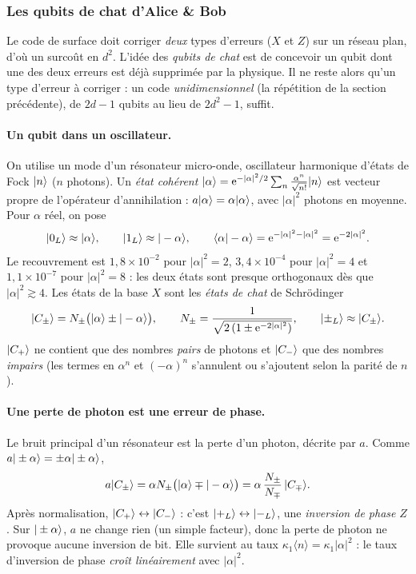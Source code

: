 \subsubsection{Les qubits de chat d'Alice \& Bob}

Le code de surface doit corriger \emph{deux} types d'erreurs ($X$ et $Z$) sur un réseau plan, d'où un surcoût en $d^2$. L'idée des
\emph{qubits de chat} \parencite{mirrahimi2014} est de concevoir un qubit dont une des deux erreurs est déjà supprimée par la physique. Il ne reste
alors qu'un type d'erreur à corriger : un code \emph{unidimensionnel} (la répétition de la section précédente), de $2d-1$ qubits
au lieu de $2d^2-1$, suffit.

\paragraph{Un qubit dans un oscillateur.} On utilise un mode d'un résonateur micro-onde, oscillateur harmonique d'états de
Fock $|n\rangle$ ($n$ photons). Un \emph{état cohérent} $|\alpha\rangle=\mathrm{e}^{-|\alpha|^2/2}\sum_n\frac{\alpha^n}{\sqrt{n!}}|n\rangle$ est vecteur propre de l'opérateur
d'annihilation : $a|\alpha\rangle=\alpha|\alpha\rangle$, avec $|\alpha|^2$ photons en moyenne. Pour $\alpha$ réel, on pose
\[
  |0_L\rangle\approx|\alpha\rangle,\qquad|1_L\rangle\approx|-\alpha\rangle,\qquad
  \langle \alpha|-\alpha\rangle=\mathrm{e}^{-|\alpha|^2-|\alpha|^2}=\mathrm{e}^{-2|\alpha|^2}.
\]
Le recouvrement est $1{,}8\times10^{-2}$ pour $|\alpha|^2=2$, $3{,}4\times10^{-4}$ pour $|\alpha|^2=4$ et $1{,}1\times10^{-7}$ pour
$|\alpha|^2=8$ : les deux états sont presque orthogonaux dès que $|\alpha|^2\gtrsim4$. Les états de la base $X$ sont les
\emph{états de chat} de Schrödinger
\[
  |C_\pm\rangle=N_\pm\big(|\alpha\rangle\pm|-\alpha\rangle\big),\qquad N_\pm=\frac{1}{\sqrt{2\,(1\pm\mathrm{e}^{-2|\alpha|^2})}},\qquad
  |\pm_L\rangle\approx|C_\pm\rangle.
\]
$|C_+\rangle$ ne contient que des nombres \emph{pairs} de photons et $|C_-\rangle$ que des nombres \emph{impairs} (les termes en
$\alpha^n$ et $(-\alpha)^n$ s'annulent ou s'ajoutent selon la parité de $n$).

\paragraph{Une perte de photon est une erreur de phase.} Le bruit principal d'un résonateur est la perte d'un photon, décrite par $a$.
Comme $a|\pm\alpha\rangle=\pm\alpha|\pm\alpha\rangle$,
\[
  a|C_\pm\rangle=\alpha N_\pm\big(|\alpha\rangle\mp|-\alpha\rangle\big)=\alpha\,\frac{N_\pm}{N_\mp}\,|C_\mp\rangle.
\]
Après normalisation, $|C_+\rangle\leftrightarrow|C_-\rangle$ : c'est $|+_L\rangle\leftrightarrow|-_L\rangle$, une \emph{inversion de phase} $Z$. Sur
$|\pm\alpha\rangle$, $a$ ne change rien (un simple facteur), donc la perte de photon ne provoque aucune inversion de bit. Elle survient au taux
$\kappa_1\langle n\rangle=\kappa_1|\alpha|^2$ : le taux d'inversion de phase \emph{croît linéairement} avec $|\alpha|^2$.

